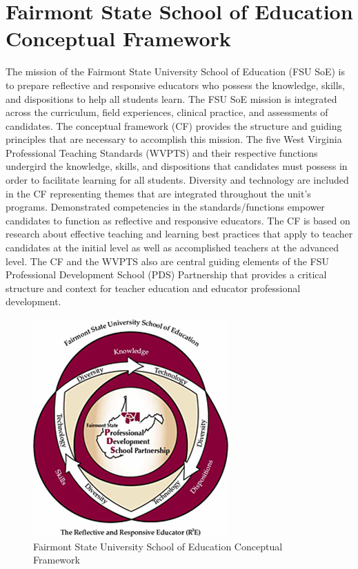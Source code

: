 \documentclass[two-side]{tufte-handout}
\begin{document}
\section{Fairmont State School of Education Conceptual Framework}
The mission of the Fairmont State University School of Education (FSU SoE) is to prepare reflective and responsive educators who possess the knowledge, skills, and dispositions to help all students learn. The FSU SoE mission is integrated across the curriculum, field experiences, clinical practice, and assessments of candidates. The conceptual framework (CF) provides the structure and guiding principles that are necessary to accomplish this mission. The five West Virginia Professional Teaching Standards (WVPTS) and their respective functions undergird the knowledge, skills, and dispositions that candidates must possess in order to facilitate learning for all students. Diversity and technology are included in the CF representing themes that are integrated throughout the unit's programs. Demonstrated competencies in the standards/functions empower candidates to function as reflective and responsive educators. The CF is based on research about effective teaching and learning best practices that apply to teacher candidates at the initial level as well as accomplished teachers at the advanced level. The CF and the WVPTS also are central guiding elements of the FSU Professional Development School (PDS) Partnership that provides a critical structure and context for teacher education and educator professional development.

\begin{center}
\begin{figure}%
  \centerline{\includegraphics[width=0.5\linewidth]{fsu-cf.png}}
  \caption{Fairmont State University School of Education Conceptual Framework}
  \label{fig:fsu-cf}
\end{figure}
\end{center}
\end{document}
